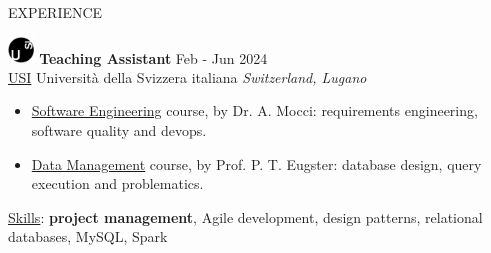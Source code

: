 \documentclass{cv} %
\def\intraexpvspace{0.15cm}
\def\titlelistvspace{-0.15cm}
\begin{document}
\vspace{-0.2cm}
\begin{rSection}{EXPERIENCE}


    \includegraphics[width=0.7cm, trim={0cm 10cm 0cm 0cm}]{usi-icon.png}
    \hspace*{0cm}\textbf{Teaching Assistant} \hfill Feb - Jun 2024\\
    \hspace*{0.85cm}\href{https://www.usi.ch/}{USI} Università della Svizzera italiana
    \hfill \textit{Switzerland, Lugano}
    \vspace{\titlelistvspace}\begin{itemize}
        \itemsep -3pt {}
        \item \href{https://search.usi.ch/it/corsi/35268192/software-atelier-4-software-engineering-project}{Software Engineering}
              course, by Dr. A. Mocci: requirements engineering, software quality and devops.

        \item \href{https://search.usi.ch/it/corsi/35268184/data-management}{Data Management}
              course, by Prof. P. T. Eugster: database design, query execution and problematics.
    \end{itemize}
    \vspace*{-0.1cm}\hspace*{0.5cm}\underline{Skills}: \textbf{project management}, Agile development, design patterns, relational databases, MySQL, Spark
    \vspace{\intraexpvspace}


\end{rSection}
\end{document}
